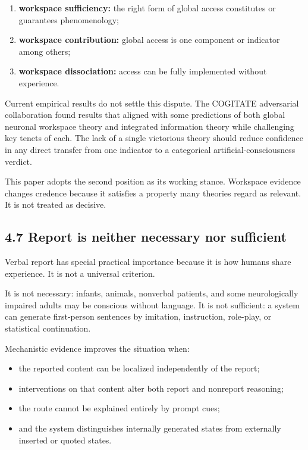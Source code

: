\documentclass[
  11pt,
]{article}
\providecommand{\tightlist}{%
  \setlength{\itemsep}{0pt}\setlength{\parskip}{0pt}}
\begin{document}
\begin{enumerate}
\def\labelenumi{\arabic{enumi}.}
\tightlist
\item
  \textbf{workspace sufficiency:} the right form of global access
  constitutes or guarantees phenomenology;
\item
  \textbf{workspace contribution:} global access is one component or
  indicator among others;
\item
  \textbf{workspace dissociation:} access can be fully implemented
  without experience.
\end{enumerate}

Current empirical results do not settle this dispute. The COGITATE
adversarial collaboration found results that aligned with some
predictions of both global neuronal workspace theory and integrated
information theory while challenging key tenets of each. The lack of a
single victorious theory should reduce confidence in any direct transfer
from one indicator to a categorical artificial-consciousness verdict.

This paper adopts the second position as its working stance. Workspace
evidence changes credence because it satisfies a property many theories
regard as relevant. It is not treated as decisive.

\subsection{4.7 Report is neither necessary nor
sufficient}\label{report-is-neither-necessary-nor-sufficient}

Verbal report has special practical importance because it is how humans
share experience. It is not a universal criterion.

It is not necessary: infants, animals, nonverbal patients, and some
neurologically impaired adults may be conscious without language. It is
not sufficient: a system can generate first-person sentences by
imitation, instruction, role-play, or statistical continuation.

Mechanistic evidence improves the situation when:

\begin{itemize}
\tightlist
\item
  the reported content can be localized independently of the report;
\item
  interventions on that content alter both report and nonreport
  reasoning;
\item
  the route cannot be explained entirely by prompt cues;
\item
  and the system distinguishes internally generated states from
  externally inserted or quoted states.
\end{itemize}
\end{document}
